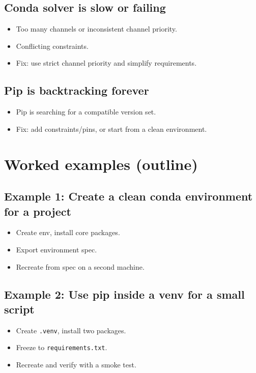 \subsection{Conda solver is slow or failing}
\begin{itemize}
\item Too many channels or inconsistent channel priority.
\item Conflicting constraints.
\item Fix: use strict channel priority and simplify requirements.
\end{itemize}

\subsection{Pip is backtracking forever}
\begin{itemize}
\item Pip is searching for a compatible version set.
\item Fix: add constraints/pins, or start from a clean environment.
\end{itemize}

\section{Worked examples (outline)}
\subsection{Example 1: Create a clean conda environment for a project}
\begin{itemize}
\item Create env, install core packages.
\item Export environment spec.
\item Recreate from spec on a second machine.
\end{itemize}

\subsection{Example 2: Use pip inside a venv for a small script}
\begin{itemize}
\item Create \texttt{.venv}, install two packages.
\item Freeze to \texttt{requirements.txt}.
\item Recreate and verify with a smoke test.
\end{itemize}

